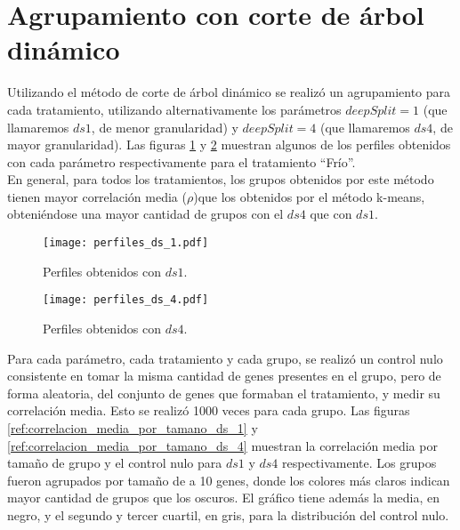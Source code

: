 \section{Agrupamiento con corte de árbol dinámico}
Utilizando el método de corte de árbol dinámico se realizó un agrupamiento para cada tratamiento, utilizando alternativamente los parámetros $deepSplit=1$ (que llamaremos $ds1$, de menor granularidad) y $deepSplit=4$ (que llamaremos $ds4$, de mayor granularidad). Las figuras \ref{fig:perfiles_ds_1} y \ref{fig:perfiles_ds_4} muestran algunos de los perfiles obtenidos con cada parámetro respectivamente para el tratamiento ``Frío''.\\ 
En general, para todos los tratamientos, los grupos obtenidos por este método tienen mayor correlación media ($\rho$)que los obtenidos por el método k-means, obteniéndose una mayor cantidad de grupos con el $ds4$ que con $ds1$.\\
\begin{figure*}[t!]
    \centering
    \begin{subfigure}[t]{0.45\textwidth}
    \centering
    \texttt{[image: perfiles\_ds\_1.pdf]}
    \caption{Perfiles obtenidos con $ds1$.}
    \label{fig:perfiles_ds_1}
    \end{subfigure}
    \begin{subfigure}[t]{0.45\textwidth}
    \centering
    \texttt{[image: perfiles\_ds\_4.pdf]}
    \caption{Perfiles obtenidos con $ds4$.}
    \label{fig:perfiles_ds_4}
    \end{subfigure}
    \caption{Perfiles de expresión génica obtenidos con el método corte de árbol dinámico para $ds1$ y $ds4$ para el tratamiento 'Frío'. En negro, el valor medio de cada grupo.}
\end{figure*}

Para cada parámetro, cada tratamiento y cada grupo, se realizó un control nulo consistente en tomar la misma cantidad de genes presentes en el grupo, pero de forma aleatoria, del conjunto de genes que formaban el tratamiento, y medir su correlación media. Esto se realizó 1000 veces para cada grupo. Las figuras \ref{ref:correlacion_media_por_tamano_ds_1} y \ref{ref:correlacion_media_por_tamano_ds_4} muestran la correlación media por tamaño de grupo y el control nulo para $ds1$ y $ds4$ respectivamente. Los grupos fueron agrupados por tamaño de a 10 genes, donde los colores más claros indican mayor cantidad de grupos que los oscuros. El gráfico tiene además la media, en negro, y el segundo y tercer cuartil, en gris, para la distribución del control nulo.

